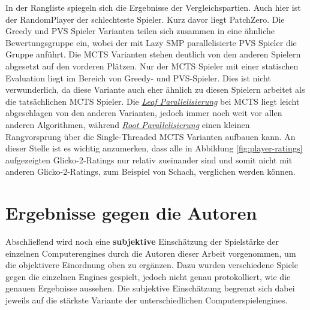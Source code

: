 In der Rangliste spiegeln sich die Ergebnisse der Vergleichspartien. Auch hier ist der RandomPlayer der schlechteste Spieler. Kurz davor liegt PatchZero. Die Greedy und \ac{PVS} Spieler Varianten teilen sich zusammen in eine ähnliche Bewertungsgruppe ein, wobei der mit Lazy \ac{SMP} parallelisierte \ac{PVS} Spieler die Gruppe anführt. Die \ac{MCTS} Varianten stehen deutlich von den anderen Spielern abgesetzt auf den vorderen Plätzen. Nur der \ac{MCTS} Spieler mit einer statischen Evaluation liegt im Bereich von Greedy- und \ac{PVS}-Spieler. Dies ist nicht verwunderlich, da diese Variante auch eher ähnlich zu diesen Spielern arbeitet als die tatsächlichen \ac{MCTS} Spieler. Die \hyperref[text:leaf-parallelization]{\emph{Leaf Parallelisierung}} bei \ac{MCTS} liegt leicht abgeschlagen von den anderen Varianten, jedoch immer noch weit vor allen anderen Algorithmen, während \hyperref[text:root-parallelization]{\emph{Root Parallelisierung}} einen kleinen Rangvorsprung über die Single-Threaded \ac{MCTS} Varianten aufbauen kann. An dieser Stelle ist es wichtig anzumerken, dass alle in Abbildung \ref{fig:player-ratings} aufgezeigten Glicko-2-Ratings nur relativ zueinander sind und somit nicht mit anderen Glicko-2-Ratings, zum Beispiel von Schach, verglichen werden können.

\pagebreak

\section{Ergebnisse gegen die Autoren}

Abschließend wird noch eine \textbf{subjektive} Einschätzung der Spielstärke der einzelnen Computerengines durch die Autoren dieser Arbeit vorgenommen, um die objektivere Einordnung oben zu ergänzen. Dazu wurden verschiedene Spiele gegen die einzelnen Engines gespielt, jedoch nicht genau protokolliert, wie die genauen Ergebnisse aussehen. Die subjektive Einschätzung begrenzt sich dabei jeweils auf die stärkste Variante der unterschiedlichen Computerspielengines.

